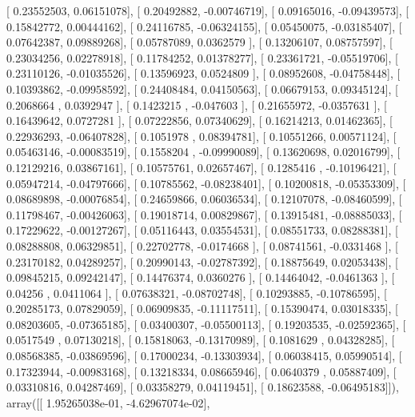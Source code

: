 \documentclass{article}
\begin{document}
       [ 0.23552503,  0.06151078],
       [ 0.20492882, -0.00746719],
       [ 0.09165016, -0.09439573],
       [ 0.15842772,  0.00444162],
       [ 0.24116785, -0.06324155],
       [ 0.05450075, -0.03185407],
       [ 0.07642387,  0.09889268],
       [ 0.05787089,  0.0362579 ],
       [ 0.13206107,  0.08757597],
       [ 0.23034256,  0.02278918],
       [ 0.11784252,  0.01378277],
       [ 0.23361721, -0.05519706],
       [ 0.23110126, -0.01035526],
       [ 0.13596923,  0.0524809 ],
       [ 0.08952608, -0.04758448],
       [ 0.10393862, -0.09958592],
       [ 0.24408484,  0.04150563],
       [ 0.06679153,  0.09345124],
       [ 0.2068664 ,  0.0392947 ],
       [ 0.1423215 , -0.047603  ],
       [ 0.21655972, -0.0357631 ],
       [ 0.16439642,  0.0727281 ],
       [ 0.07222856,  0.07340629],
       [ 0.16214213,  0.01462365],
       [ 0.22936293, -0.06407828],
       [ 0.1051978 ,  0.08394781],
       [ 0.10551266,  0.00571124],
       [ 0.05463146, -0.00083519],
       [ 0.1558204 , -0.09990089],
       [ 0.13620698,  0.02016799],
       [ 0.12129216,  0.03867161],
       [ 0.10575761,  0.02657467],
       [ 0.1285416 , -0.10196421],
       [ 0.05947214, -0.04797666],
       [ 0.10785562, -0.08238401],
       [ 0.10200818, -0.05353309],
       [ 0.08689898, -0.00076854],
       [ 0.24659866,  0.06036534],
       [ 0.12107078, -0.08460599],
       [ 0.11798467, -0.00426063],
       [ 0.19018714,  0.00829867],
       [ 0.13915481, -0.08885033],
       [ 0.17229622, -0.00127267],
       [ 0.05116443,  0.03554531],
       [ 0.08551733,  0.08288381],
       [ 0.08288808,  0.06329851],
       [ 0.22702778, -0.0174668 ],
       [ 0.08741561, -0.0331468 ],
       [ 0.23170182,  0.04289257],
       [ 0.20990143, -0.02787392],
       [ 0.18875649,  0.02053438],
       [ 0.09845215,  0.09242147],
       [ 0.14476374,  0.0360276 ],
       [ 0.14464042, -0.0461363 ],
       [ 0.04256   ,  0.0411064 ],
       [ 0.07638321, -0.08702748],
       [ 0.10293885, -0.10786595],
       [ 0.20285173,  0.07829059],
       [ 0.06909835, -0.11117511],
       [ 0.15390474,  0.03018335],
       [ 0.08203605, -0.07365185],
       [ 0.03400307, -0.05500113],
       [ 0.19203535, -0.02592365],
       [ 0.0517549 ,  0.07130218],
       [ 0.15818063, -0.13170989],
       [ 0.1081629 ,  0.04328285],
       [ 0.08568385, -0.03869596],
       [ 0.17000234, -0.13303934],
       [ 0.06038415,  0.05990514],
       [ 0.17323944, -0.00983168],
       [ 0.13218334,  0.08665946],
       [ 0.0640379 ,  0.05887409],
       [ 0.03310816,  0.04287469],
       [ 0.03358279,  0.04119451],
       [ 0.18623588, -0.06495183]]), array([[  1.95265038e-01,  -4.62967074e-02],
\end{document}
